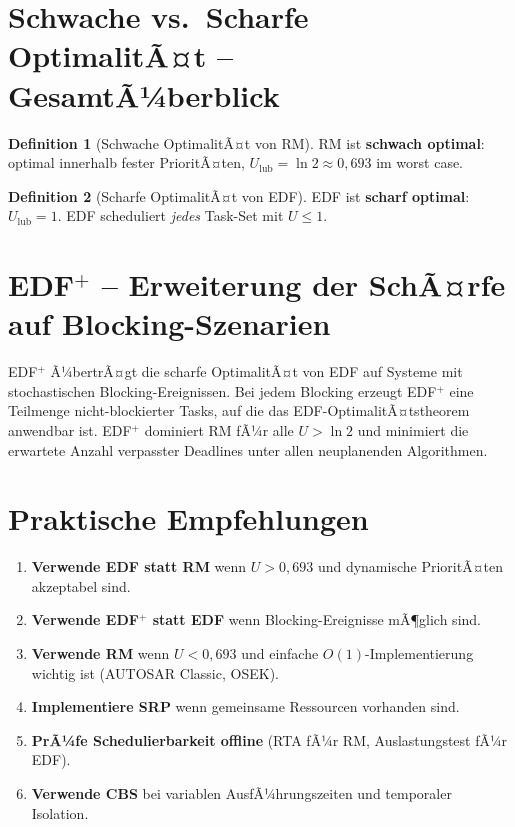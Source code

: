﻿\documentclass[a4paper,12pt]{report}
\theoremstyle{definition}
\newtheorem{definition}{Definition}[chapter]
\begin{document}
\section{Schwache vs.\ Scharfe OptimalitÃ¤t -- GesamtÃ¼berblick}

\begin{definition}[Schwache OptimalitÃ¤t von RM]
	RM ist \textbf{schwach optimal}: optimal innerhalb fester PrioritÃ¤ten,
	$U_{\text{lub}} = \ln 2 \approx 0{,}693$ im worst case.
\end{definition}

\begin{definition}[Scharfe OptimalitÃ¤t von EDF]
	EDF ist \textbf{scharf optimal}: $U_{\text{lub}} = 1$.
	EDF scheduliert \emph{jedes} Task-Set mit $U \leq 1$.
\end{definition}

\section{EDF$^+$ -- Erweiterung der SchÃ¤rfe auf Blocking-Szenarien}

EDF$^+$ \cite{Epp2026} Ã¼bertrÃ¤gt die scharfe OptimalitÃ¤t von EDF auf Systeme
mit stochastischen Blocking-Ereignissen. Bei jedem Blocking erzeugt EDF$^+$ eine
Teilmenge nicht-blockierter Tasks, auf die das EDF-OptimalitÃ¤tstheorem anwendbar ist.
EDF$^+$ dominiert RM fÃ¼r alle $U > \ln 2$ und minimiert die erwartete Anzahl
verpasster Deadlines unter allen neuplanenden Algorithmen.

\section{Praktische Empfehlungen}

\begin{enumerate}
	\item \textbf{Verwende EDF statt RM} wenn $U > 0{,}693$ und dynamische PrioritÃ¤ten
	      akzeptabel sind.
	\item \textbf{Verwende EDF$^+$ statt EDF} wenn Blocking-Ereignisse mÃ¶glich sind.
	\item \textbf{Verwende RM} wenn $U < 0{,}693$ und einfache $O(1)$-Implementierung
	      wichtig ist (AUTOSAR Classic, OSEK).
	\item \textbf{Implementiere SRP} wenn gemeinsame Ressourcen vorhanden sind.
	\item \textbf{PrÃ¼fe Schedulierbarkeit offline} (RTA fÃ¼r RM, Auslastungstest fÃ¼r EDF).
	\item \textbf{Verwende CBS} bei variablen AusfÃ¼hrungszeiten und temporaler Isolation.
\end{enumerate}
\end{document}
